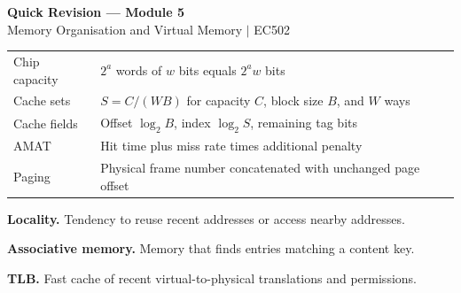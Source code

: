 \documentclass[12pt,a4paper]{article}
\renewcommand{\arraystretch}{1.45}
\begin{document}
\newpage
\begin{center}
  {\large\bfseries\color{myred} Quick Revision --- Module 5}\\[3pt]
  {\small\color{mydark} Memory Organisation and Virtual Memory $|$ EC502}
\end{center}
\noindent{\color{myred}\rule{\linewidth}{1.2pt}}
\begin{tcolorbox}[formulabox,title={Key Formulas at a Glance}]
\renewcommand{\arraystretch}{1.35}
\begin{tabularx}{\linewidth}{B{5.0cm}Y}
Chip capacity & $2^a$ words of $w$ bits equals $2^aw$ bits \\[3pt]
Cache sets & $S=C/(WB)$ for capacity $C$, block size $B$, and $W$ ways \\[3pt]
Cache fields & Offset $\log_2B$, index $\log_2 S$, remaining tag bits \\[3pt]
AMAT & Hit time plus miss rate times additional penalty \\[3pt]
Paging & Physical frame number concatenated with unchanged page offset \\[3pt]
\end{tabularx}
\end{tcolorbox}
\begin{tcolorbox}[defbox,title={One-Line Definitions}]
\textbf{Locality.} Tendency to reuse recent addresses or access nearby addresses.\par
\textbf{Associative memory.} Memory that finds entries matching a content key.\par
\textbf{TLB.} Fast cache of recent virtual-to-physical translations and permissions.\par
\end{tcolorbox}
\end{document}
